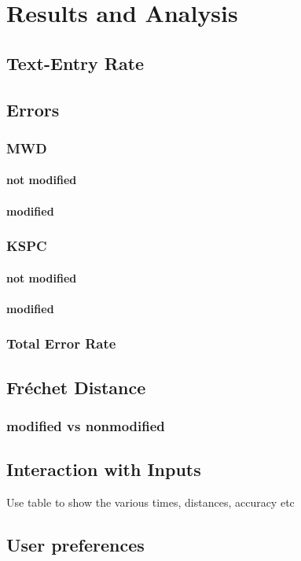 \chapter{Results and Analysis}

\section{Text-Entry Rate}

\section{Errors}

\subsection{MWD}

\subsubsection{not modified}

\subsubsection{modified}

\subsection{KSPC}

\subsubsection{not modified}

\subsubsection{modified}

\subsection{Total Error Rate}

\section{Fréchet Distance}

\subsection{modified vs nonmodified}

\section{Interaction with Inputs}

Use table to show the various times, distances, accuracy etc

\section{User preferences}